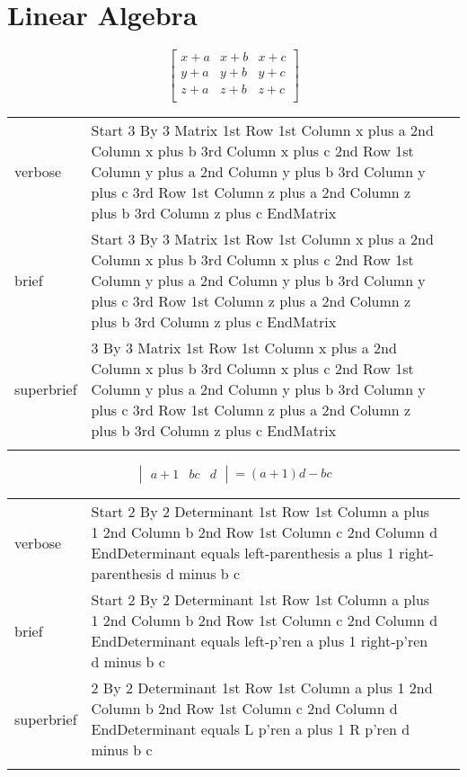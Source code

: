 
\section{Linear Algebra}
\label{sec:la}

\R
\E \[
\begin{bmatrix}
  x+a & x+b & x+c\\
  y+a & y+b & y+c\\
  z+a & z+b & z+c\\
\end{bmatrix}
\]

\begin{longtable}[c]{@{}lll@{}}
\toprule\addlinespace
verbose & Start 3 By 3 Matrix 1st Row 1st Column x plus a 2nd Column x
plus b 3rd Column x plus c 2nd Row 1st Column y plus a 2nd Column y plus
b 3rd Column y plus c 3rd Row 1st Column z plus a 2nd Column z plus b
3rd Column z plus c EndMatrix &

\\\addlinespace
brief & Start 3 By 3 Matrix 1st Row 1st Column x plus a 2nd Column x
plus b 3rd Column x plus c 2nd Row 1st Column y plus a 2nd Column y plus
b 3rd Column y plus c 3rd Row 1st Column z plus a 2nd Column z plus b
3rd Column z plus c EndMatrix &

\\\addlinespace
superbrief & 3 By 3 Matrix 1st Row 1st Column x plus a 2nd Column x plus
b 3rd Column x plus c 2nd Row 1st Column y plus a 2nd Column y plus b
3rd Column y plus c 3rd Row 1st Column z plus a 2nd Column z plus b 3rd
Column z plus c EndMatrix &

\\\addlinespace
\bottomrule
\end{longtable}

\R
\E \[
\begin{vmatrix}
  a+1 & b
  c & d
\end{vmatrix}
= (a+1)d-b c
\]

\begin{longtable}[c]{@{}lll@{}}
\toprule\addlinespace
verbose & Start 2 By 2 Determinant 1st Row 1st Column a plus 1 2nd
Column b 2nd Row 1st Column c 2nd Column d EndDeterminant equals
left-parenthesis a plus 1 right-parenthesis d minus b c &

\\\addlinespace
brief & Start 2 By 2 Determinant 1st Row 1st Column a plus 1 2nd Column
b 2nd Row 1st Column c 2nd Column d EndDeterminant equals left-p'ren a
plus 1 right-p'ren d minus b c &

\\\addlinespace
superbrief & 2 By 2 Determinant 1st Row 1st Column a plus 1 2nd Column b
2nd Row 1st Column c 2nd Column d EndDeterminant equals L p'ren a plus 1
R p'ren d minus b c &

\\\addlinespace
\bottomrule
\end{longtable}

